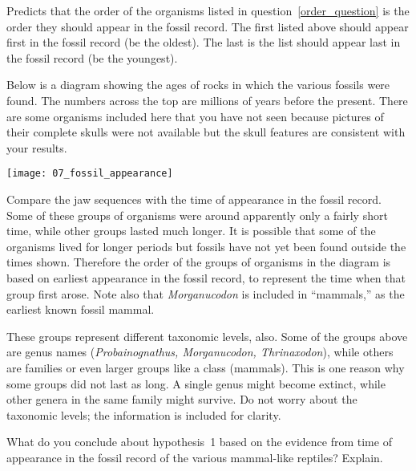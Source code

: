 \documentclass[12pt, hidelinks]{exam}
\newcommand*\AnswerBox[2]{%
    \parbox[t][#1]{0.92\textwidth}{%
    \begin{solution}#2\end{solution}}
    \vspace{\stretch{1}}
}
\begin{document}
\begin{questions}
\AnswerBox{4\baselineskip}{%
	Predicts that the order of the organisms listed in question~\ref{order_question} is the order they should appear in the fossil record. The first listed above should appear first in the fossil record (be the oldest). The last is the list should appear last in the fossil record (be the youngest). 
}

%
%
Below is a diagram showing the ages of rocks in which the various
fossils were found. The numbers across the top are millions of
years before the present. There are some organisms included here that you
have not seen because pictures of their complete skulls were not available 
but the skull features are consistent with your results.

\begin{center}
\texttt{[image: 07\_fossil\_appearance]}
\end{center}

Compare the jaw sequences with the time of appearance in the
fossil record. Some of these groups of organisms were around apparently
only a fairly short time, while other groups lasted much longer. It is possible
that some of the organisms lived for longer periods but fossils have not yet been
found outside the times shown. Therefore the order of the groups of organisms in the diagram is based on earliest
appearance in the fossil record, to represent the time when that
group first arose. Note also that \textit{Morganucodon} is included
in ``mammals,'' as the earliest known
fossil mammal.

These groups represent different taxonomic levels, also. Some of the
groups above are genus names (\emph{Probainognathus, Morganucodon,
Thrinaxodon}), while others are families or even larger groups like a class 
(mammals). This is one reason why some groups did not last as
long. A single genus might become extinct, while other genera in the
same family might survive. Do not worry about the taxonomic
levels; the information is included for clarity.

\question
What do you conclude about hypothesis~1 based on the
evidence from time of appearance in the fossil record of the various
mammal-like reptiles? Explain. 


\end{questions}
\end{document}
